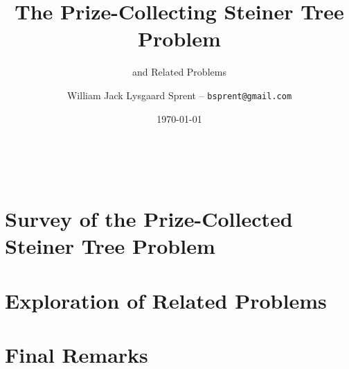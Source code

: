 \documentclass[12pt, a4paper]{report}
\title{The Prize-Collecting Steiner Tree Problem}
\author{William Jack Lysgaard Sprent -- \texttt{bsprent@gmail.com}}
\subtitle{and Related Problems}
\date{\today}
\begin{document}
\maketitle
~
\begin{abstract}
  
\end{abstract}

\tableofcontents
\clearpage
\glsresetall



\part{Survey of the Prize-Collected Steiner Tree Problem}\label{part:survey}



\glsresetall
\part{Exploration of Related Problems}



\part{Final Remarks}





\clearpage
\appendix

\end{document}
